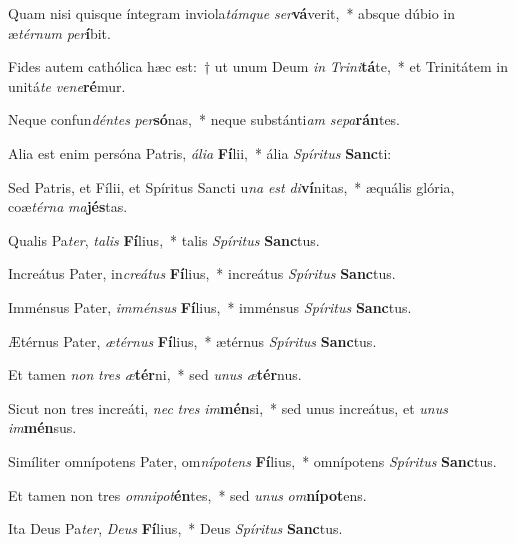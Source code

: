 \item Quam nisi quisque íntegram inviola\textit{tám}\textit{que} \textit{ser}\textbf{vá}verit,~* absque dúbio in æ\textit{tér}\textit{num} \textit{per}\textbf{í}bit.
\item Fides autem cathólica hæc est:~† ut unum Deum \textit{in} \textit{Tri}\textit{ni}\textbf{tá}te,~* et Trinitátem in unitá\textit{te} \textit{ve}\textit{ne}\textbf{ré}mur.
\item Neque confun\textit{dén}\textit{tes} \textit{per}\textbf{só}nas,~* neque substánti\textit{am} \textit{se}\textit{pa}\textbf{rán}tes.
\item Alia est enim persóna Patris, \textit{á}\textit{li}\textit{a} \textbf{Fí}lii,~* ália \textit{Spí}\textit{ri}\textit{tus} \textbf{Sanc}ti:
\item Sed Patris, et Fílii, et Spíritus Sancti u\textit{na} \textit{est} \textit{di}\textbf{ví}nitas,~* æquális glória, coæ\textit{tér}\textit{na} \textit{ma}\textbf{jés}tas.
\item Qualis Pa\textit{ter}, \textit{ta}\textit{lis} \textbf{Fí}lius,~* talis \textit{Spí}\textit{ri}\textit{tus} \textbf{Sanc}tus.
\item Increátus Pater, in\textit{cre}\textit{á}\textit{tus} \textbf{Fí}lius,~* increátus \textit{Spí}\textit{ri}\textit{tus} \textbf{Sanc}tus.
\item Imménsus Pater, \textit{im}\textit{mén}\textit{sus} \textbf{Fí}lius,~* imménsus \textit{Spí}\textit{ri}\textit{tus} \textbf{Sanc}tus.
\item Ætérnus Pater, \textit{æ}\textit{tér}\textit{nus} \textbf{Fí}lius,~* ætérnus \textit{Spí}\textit{ri}\textit{tus} \textbf{Sanc}tus.
\item Et tamen \textit{non} \textit{tres} \textit{æ}\textbf{tér}ni,~* sed \textit{u}\textit{nus} \textit{æ}\textbf{tér}nus.
\item Sicut non tres increáti, \textit{nec} \textit{tres} \textit{im}\textbf{mén}si,~* sed unus increátus, et \textit{u}\textit{nus} \textit{im}\textbf{mén}sus.
\item Simíliter omnípotens Pater, om\textit{ní}\textit{pot}\textit{ens} \textbf{Fí}lius,~* omnípotens \textit{Spí}\textit{ri}\textit{tus} \textbf{Sanc}tus.
\item Et tamen non tres \textit{om}\textit{ni}\textit{pot}\textbf{én}tes,~* sed \textit{u}\textit{nus} \textit{om}\textbf{ní}\textbf{pot}ens.
\item Ita Deus Pa\textit{ter}, \textit{De}\textit{us} \textbf{Fí}lius,~* Deus \textit{Spí}\textit{ri}\textit{tus} \textbf{Sanc}tus.
